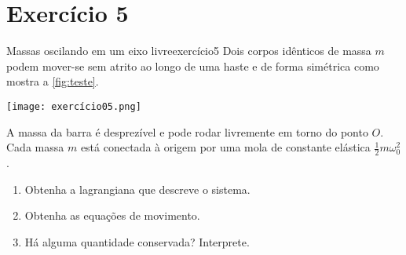 \section*{Exercício 5}
\begin{exercício}{Massas oscilando em um eixo livre}{exercício5}
    Dois corpos idênticos de massa \(m\) podem mover-se sem atrito ao longo de uma haste e de forma simétrica como mostra a \cref{fig:teste}.
    \begin{center}
        \texttt{[image: exercício05.png]}
        \label{fig:teste}
    \end{center}
    A massa da barra é desprezível e pode rodar livremente em torno do ponto \(O\). Cada massa \(m\) está conectada à origem por uma mola de constante elástica \(\frac12m\omega_0^2\).
    \begin{enumerate}[label=(\alph*)]
        \item Obtenha a lagrangiana que descreve o sistema.
        \item Obtenha as equações de movimento.
        \item Há alguma quantidade conservada? Interprete.
    \end{enumerate}
\end{exercício}
